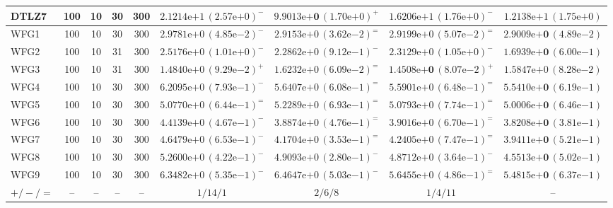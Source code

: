 \begin{table}[t]
{\begin{tabular}{lcccccccc}
DTLZ7 & 100 & 10 & 30 & 300 & $2.1214\mathrm{e}{+1}\,(2.57\mathrm{e}{+0})^{-}$ & $\mathbf{9.9013\mathrm{e}{+0}}\,(1.70\mathrm{e}{+0})^{+}$ & $1.6206\mathrm{e}{+1}\,(1.76\mathrm{e}{+0})^{-}$ & $1.2138\mathrm{e}{+1}\,(1.75\mathrm{e}{+0})$ \\
\midrule
WFG1 & 100 & 10 & 30 & 300 & $2.9781\mathrm{e}{+0}\,(4.85\mathrm{e}{-2})^{-}$ & $2.9153\mathrm{e}{+0}\,(3.62\mathrm{e}{-2})^{=}$ & $2.9199\mathrm{e}{+0}\,(5.07\mathrm{e}{-2})^{=}$ & $\mathbf{2.9009\mathrm{e}{+0}}\,(4.89\mathrm{e}{-2})$ \\
WFG2 & 100 & 10 & 31 & 300 & $2.5176\mathrm{e}{+0}\,(1.01\mathrm{e}{+0})^{-}$ & $2.2862\mathrm{e}{+0}\,(9.12\mathrm{e}{-1})^{-}$ & $2.3129\mathrm{e}{+0}\,(1.05\mathrm{e}{+0})^{-}$ & $\mathbf{1.6939\mathrm{e}{+0}}\,(6.00\mathrm{e}{-1})$ \\
WFG3 & 100 & 10 & 31 & 300 & $1.4840\mathrm{e}{+0}\,(9.29\mathrm{e}{-2})^{+}$ & $1.6232\mathrm{e}{+0}\,(6.09\mathrm{e}{-2})^{=}$ & $\mathbf{1.4508\mathrm{e}{+0}}\,(8.07\mathrm{e}{-2})^{+}$ & $1.5847\mathrm{e}{+0}\,(8.28\mathrm{e}{-2})$ \\
WFG4 & 100 & 10 & 30 & 300 & $6.2095\mathrm{e}{+0}\,(7.93\mathrm{e}{-1})^{-}$ & $5.6407\mathrm{e}{+0}\,(6.08\mathrm{e}{-1})^{=}$ & $5.5901\mathrm{e}{+0}\,(6.48\mathrm{e}{-1})^{=}$ & $\mathbf{5.5410\mathrm{e}{+0}}\,(6.19\mathrm{e}{-1})$ \\
WFG5 & 100 & 10 & 30 & 300 & $5.0770\mathrm{e}{+0}\,(6.44\mathrm{e}{-1})^{=}$ & $5.2289\mathrm{e}{+0}\,(6.93\mathrm{e}{-1})^{=}$ & $5.0793\mathrm{e}{+0}\,(7.74\mathrm{e}{-1})^{=}$ & $\mathbf{5.0006\mathrm{e}{+0}}\,(6.46\mathrm{e}{-1})$ \\
WFG6 & 100 & 10 & 30 & 300 & $4.4139\mathrm{e}{+0}\,(4.67\mathrm{e}{-1})^{-}$ & $3.8874\mathrm{e}{+0}\,(4.76\mathrm{e}{-1})^{=}$ & $3.9016\mathrm{e}{+0}\,(6.70\mathrm{e}{-1})^{=}$ & $\mathbf{3.8208\mathrm{e}{+0}}\,(3.81\mathrm{e}{-1})$ \\
WFG7 & 100 & 10 & 30 & 300 & $4.6479\mathrm{e}{+0}\,(6.53\mathrm{e}{-1})^{-}$ & $4.1704\mathrm{e}{+0}\,(3.53\mathrm{e}{-1})^{=}$ & $4.2405\mathrm{e}{+0}\,(7.47\mathrm{e}{-1})^{=}$ & $\mathbf{3.9411\mathrm{e}{+0}}\,(5.21\mathrm{e}{-1})$ \\
WFG8 & 100 & 10 & 30 & 300 & $5.2600\mathrm{e}{+0}\,(4.22\mathrm{e}{-1})^{-}$ & $4.9093\mathrm{e}{+0}\,(2.80\mathrm{e}{-1})^{-}$ & $4.8712\mathrm{e}{+0}\,(3.64\mathrm{e}{-1})^{-}$ & $\mathbf{4.5513\mathrm{e}{+0}}\,(5.02\mathrm{e}{-1})$ \\
WFG9 & 100 & 10 & 30 & 300 & $6.3482\mathrm{e}{+0}\,(5.35\mathrm{e}{-1})^{-}$ & $6.4647\mathrm{e}{+0}\,(5.03\mathrm{e}{-1})^{-}$ & $5.6455\mathrm{e}{+0}\,(4.86\mathrm{e}{-1})^{=}$ & $\mathbf{5.4815\mathrm{e}{+0}}\,(6.37\mathrm{e}{-1})$ \\
\midrule
$+/-/=$ & -- & -- & -- & -- & $1/14/1$ & $2/6/8$ & $1/4/11$ & -- \\
\bottomrule
\end{tabular}%
}
\end{table}

